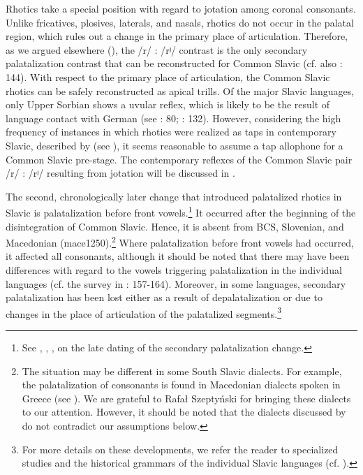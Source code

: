 \documentclass[output=paper]{langscibook}
\begin{document}
Rhotics take a special position with regard to jotation among coronal consonants. Unlike fricatives, plosives, laterals, and nasals, rhotics do not occur in the palatal region, which rules out a change in the primary place of articulation. Therefore, as we argued elsewhere (\citealt{WandlKavitskaya2023}), the /r/ : /rʲ/ contrast is the only secondary palatalization contrast that can be reconstructed for Common Slavic (cf. also \citealt{Stadnik2002}: 144). With respect to the primary place of articulation, the Common Slavic rhotics can be safely reconstructed as apical trills. Of the major Slavic languages, only Upper Sorbian shows a uvular reflex, which is likely to be the result of language contact with German (see \citealt{Jaworski2018}: 80; \citealt{Howson2018}: 132). However, considering the high frequency of instances in which rhotics were realized as taps in contemporary Slavic, described by \citet{Jaworski2018} (see ), it seems reasonable to assume a tap allophone for a Common Slavic pre-stage. The contemporary reflexes of the Common Slavic pair /r/ : /rʲ/ resulting from jotation will be discussed in .

The second, chronologically later change that introduced palatalized rhotics in Slavic is palatalization before front vowels.\footnote{See
  \citet{vanWijk1937,Gerovský1959,Koschmieder1959}, \citet[489--490]{Shevelov1964}, \citet[160]{Carlton1991}, \citet[167-176]{Stadnik2002} on the late dating of the secondary palatalization change.
}
It occurred after the beginning of the disintegration of Common Slavic. Hence, it is absent from BCS, Slovenian, and Macedonian (mace1250).\footnote{The situation may be different in some South Slavic dialects. For example, the palatalization of consonants is found in Macedonian dialects spoken in Greece (see \citealt{IvićEtAl1981}). We are grateful to Rafał Szeptyński for bringing these dialects to our attention. However, it should be noted that the dialects discussed by \citet{IvićEtAl1981} do not contradict our assumptions below.} Where palatalization before front vowels had occurred, it affected all consonants, although it should be noted that there may have been differences with regard to the vowels triggering palatalization in the individual languages (cf. the survey in \citealt{Carlton1991}: 157-164). Moreover, in some languages, secondary palatalization has been lost either as a result of depalatalization or due to changes in the place of articulation of the palatalized segments.\footnote{For more details on these developments, we refer the reader to specialized studies and the historical grammars of the individual Slavic languages (cf. \citealt{Kalnyn1961,Carlton1991,Stadnik2002}).}
\end{document}
